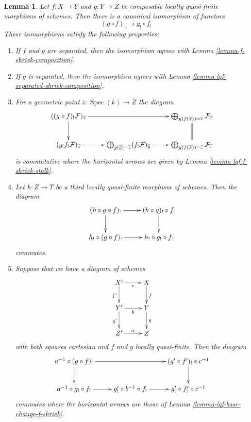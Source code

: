 \documentclass{stacks-project}
\theoremstyle{plain}
\newtheorem{lemma}[subsection]{Lemma}
\theoremstyle{definition}
\theoremstyle{remark}
\numberwithin{equation}{subsection}
\def\Spec{\mathop{\mathrm{Spec}}}
\begin{document}
\begin{lemma}
\label{lemma-lqf-shriek-composition}
Let $f : X \to Y$ and $g : Y \to Z$ be composable locally quasi-finite
morphisms of schemes. Then there is a canonical isomorphism of functors
$$
(g \circ f)_! \longrightarrow g_! \circ f_!
$$
These isomorphisms satisfy the following properties:
\begin{enumerate}
\item If $f$ and $g$ are separated, then the isomorphism agrees
with Lemma \ref{lemma-f-shriek-composition}.
\item If $g$ is separated, then the isomorphism agrees with
Lemma \ref{lemma-lqf-separated-shriek-composition}.
\item For a geometric point $\overline{z} : \Spec(k) \to Z$ the diagram
$$
\xymatrix{
((g \circ f)_!\mathcal{F})_{\overline{z}} \ar[d] \ar[rr] & &
\bigoplus\nolimits_{g(f(\overline{x})) = \overline{z}}
\mathcal{F}_{\overline{x}} \ar@{=}[d] \\
(g_!f_!\mathcal{F})_{\overline{z}} \ar[r] &
\bigoplus\nolimits_{g(\overline{y}) = \overline{z}}
(f_!\mathcal{F})_{\overline{y}} \ar[r] &
\bigoplus\nolimits_{g(f(\overline{x})) = \overline{z}}
\mathcal{F}_{\overline{x}}
}
$$
is commutative where the horizontal arrows are given by
Lemma \ref{lemma-lqf-f-shriek-stalk}.
\item Let $h : Z \to T$ be a third locally quasi-finite
morphism of schemes. Then the diagram
$$
\xymatrix{
(h \circ g \circ f)_! \ar[r] \ar[d] &
(h \circ g)_! \circ f_! \ar[d] \\
h_! \circ (g \circ f)_! \ar[r] &
h_! \circ g_! \circ f_!
}
$$
commutes.
\item Suppose that we have a diagram of schemes
$$
\xymatrix{
X' \ar[d]_{f'} \ar[r]_c & X \ar[d]^f \\
Y' \ar[d]_{g'} \ar[r]_b & Y \ar[d]^g \\
Z' \ar[r]^a & Z
}
$$
with both squares cartesian and $f$ and $g$
locally quasi-finite. Then the diagram
$$
\xymatrix{
a^{-1} \circ (g \circ f)_! \ar[d] \ar[rr] & &
(g' \circ f')_! \circ c^{-1} \ar[d] \\
a^{-1} \circ g_! \circ f_! \ar[r] &
g'_! \circ b^{-1} \circ f_! \ar[r] &
g'_! \circ f'_! \circ c^{-1}
}
$$
commutes where the horizontal arrows are those of
Lemma \ref{lemma-lqf-base-change-f-shriek}.
\end{enumerate}
\end{lemma}
\end{document}
